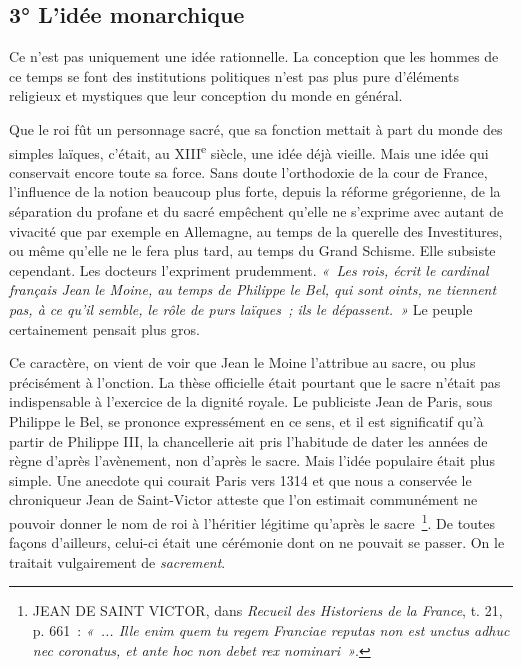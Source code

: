 \documentclass[french,twoside]{book} %
\begin{document}
\subsection[{3° L’idée monarchique}]{3° L’idée monarchique}
\label{c03b3}
\noindent Ce n’est pas uniquement une idée rationnelle. La conception que les hommes de ce temps se font des institutions politiques n’est pas plus pure d’éléments religieux et mystiques que leur conception du monde en général.\par
Que le roi fût un personnage sacré, que sa fonction mettait à part du monde des simples laïques, c’était, au XIII\textsuperscript{e} siècle, une idée déjà vieille. Mais une idée qui conservait encore toute sa force. Sans doute l’orthodoxie de la cour de France, l’influence de la notion beaucoup plus forte, depuis la réforme grégorienne, de la séparation  
\label{p17} du profane et du sacré empêchent qu’elle ne s’exprime avec autant de vivacité que par exemple en Allemagne, au temps de la querelle des Investitures, ou même qu’elle ne le fera plus tard, au temps du Grand Schisme. Elle subsiste cependant. Les docteurs l’expriment prudemment. \emph{« Les rois, écrit le cardinal français Jean le Moine, au temps de Philippe le Bel, qui sont oints, ne tiennent pas, à ce qu’il semble, le rôle de purs laïques ; ils le dépassent. »} Le peuple certainement pensait plus gros.\par
Ce caractère, on vient de voir que Jean le Moine l’attribue au sacre, ou plus précisément à l’onction. La thèse officielle était pourtant que le sacre n’était pas indispensable à l’exercice de la dignité royale. Le publiciste Jean de Paris, sous Philippe le Bel, se prononce expressément en ce sens, et il est significatif qu’à partir de Philippe III, la chancellerie ait pris l’habitude de dater les années de règne d’après l’avènement, non d’après le sacre. Mais l’idée populaire était plus simple. Une anecdote qui courait Paris vers 1314 et que nous a conservée le chroniqueur Jean de Saint-Victor atteste que l’on estimait communément ne pouvoir donner le nom de roi à l’héritier légitime qu’après le sacre \footnote{ JEAN DE SAINT VICTOR, dans {\itshape Recueil des Historiens de la France}, t. 21, p. 661 : \emph{« ... Ille enim quem tu regem Franciae reputas non est unctus adhuc nec coronatus, et ante hoc non debet rex nominari »}.}. De toutes façons d’ailleurs, celui-ci était une cérémonie dont on ne pouvait se passer. On le traitait vulgairement de \emph{sacrement}.\par
\end{document}
